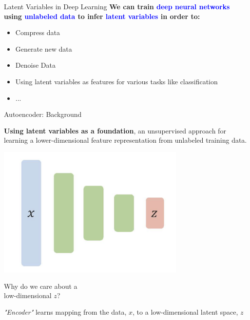 \documentclass[serif, aspectratio=169]{beamer}
\begin{document}
\begin{frame}{Latent Variables in Deep Learning}
        \textbf{We can train \textcolor{blue}{deep neural networks} using  \textcolor{blue}{unlabeled data} to infer \textcolor{blue}{latent variables} in order to:}
        \vspace{0.5cm}
        \begin{itemize}
        \small
            \item Compress data
            \item Generate new data
            \item Denoise Data
            \item Using latent variables as features for various tasks like classification
            \item ...
        \end{itemize}
\end{frame}


\begin{frame}{Autoencoder: Background}
    \begin{center}
        \textbf{Using latent variables as a foundation}, an unsupervised approach for learning a lower-dimensional feature representation from unlabeled training data.
        
        \vspace{0.3cm}
        
        \begin{minipage}{0.6\textwidth}
            \centering
            \includegraphics[width=0.7\textwidth]{pic/AE background1.png}
        \end{minipage}
        \hspace{0.05\textwidth} 
        \begin{minipage}{0.3\textwidth}
            \raggedright
            Why do we care about a \\ low-dimensional \textit{$z$}?
        \end{minipage}
        
        \vspace{0.3cm}
        
        \textit{"Encoder"} learns mapping from the data, \textit{$x$}, to a low-dimensional latent space, \textit{$z$}
    \end{center}
\end{frame}
\end{document}
